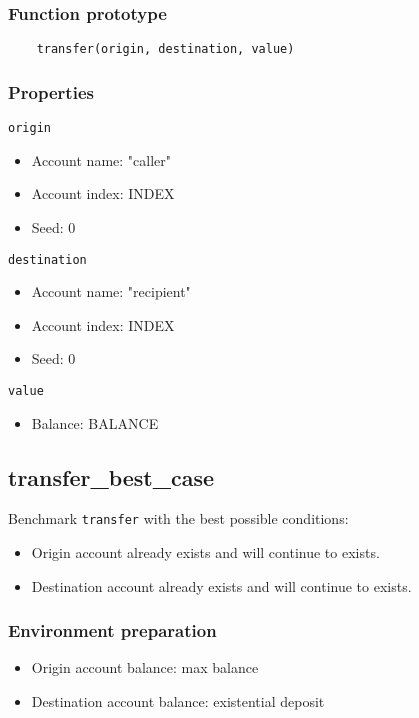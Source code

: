 \documentclass[11pt,a4paper]{article}
\begin{document}
\subsubsection*{Function prototype}
\begin{verbatim}
    transfer(origin, destination, value)
\end{verbatim}

\subsubsection*{Properties}
\verb|origin|
\begin{itemize}
\item Account name: "caller"
\item Account index: INDEX
\item Seed: 0
\end{itemize}
\verb|destination|
\begin{itemize}
\item Account name: "recipient"
\item Account index: INDEX
\item Seed: 0
\end{itemize}
\verb|value|
\begin{itemize}
\item Balance: BALANCE
\end{itemize}

\subsection{transfer\_best\_case}

Benchmark \verb|transfer| with the best possible conditions:
\begin{itemize}
\item Origin account already exists and will continue to exists.
\item Destination account already exists and will continue to exists.
\end{itemize}

\subsubsection*{Environment preparation}
\begin{itemize}
\item Origin account balance: max balance
\item Destination account balance: existential deposit
\end{itemize}
\end{document}
